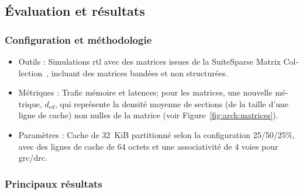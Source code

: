 \begin{otherlanguage}{french}
\subsection*{\'Evaluation et résultats}

\subsubsection*{Configuration et méthodologie}

\begin{itemize}
    \item Outils : Simulations \acrshort{rtl} avec des matrices issues de la SuiteSparse Matrix Collection~\cite{Kolodziej2019_SuiteSparse}, incluant des matrices bandées et non structurées.
    \item Métriques : Trafic mémoire et latences; pour les matrices, une nouvelle métrique, $d_\mathit{cd}$, qui représente la densité moyenne de sections (de la taille d'une ligne de cache) non nulles de la matrice (voir Figure~\ref{fig:arch:matrices}).
    \item Paramètres : Cache de 32~KiB partitionné selon la configuration 25/50/25\%, avec des lignes de cache de 64 octets et une associativité de 4 voies pour \acrshort{grc}/\acrshort{drc}.
\end{itemize}

\subsubsection*{Principaux résultats}


\end{otherlanguage}
